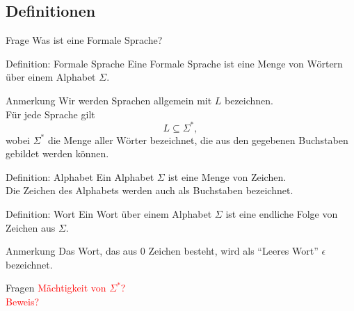 \documentclass[]{beamer}
\begin{document}
\subsection{Definitionen}
\begin{frame}[squeeze]{}{}
  \begin{alertblock}{Frage}
    Was ist eine Formale Sprache?
  \end{alertblock}
  
  \pause
  
  \begin{block}{Definition: Formale Sprache}
    Eine Formale Sprache ist eine Menge von Wörtern über einem Alphabet $\Sigma$. \\
  \end{block}
  
  \pause
  
  \begin{block}{Anmerkung}
    Wir werden Sprachen allgemein mit $L$ bezeichnen. \\
    Für jede Sprache gilt
    \[L \subseteq \Sigma^*,\]
    wobei $\Sigma^*$ die Menge aller Wörter bezeichnet, die aus den gegebenen Buchstaben gebildet werden können. \\
  \end{block}
\end{frame}

\begin{frame}[squeeze]{}{}
  \begin{block}{Definition: Alphabet}
    Ein Alphabet $\Sigma$ ist eine Menge von Zeichen. \\
    Die Zeichen des Alphabets werden auch als Buchstaben bezeichnet.
  \end{block}
  
  \pause
  
  \begin{block}{Definition: Wort}
    Ein Wort über einem Alphabet $\Sigma$ ist eine endliche Folge von Zeichen aus $\Sigma$.
  \end{block}
  
  \pause
  
  \begin{block}{Anmerkung}
    Das Wort, das aus $0$ Zeichen besteht, wird als \enquote{Leeres Wort} $\epsilon$ bezeichnet.
  \end{block}
  
  \pause
  
  \begin{alertblock}{Fragen}
    \textcolor{red}{Mächtigkeit von $\Sigma^*$?} \\
    \pause
    \textcolor{red}{Beweis?}
  \end{alertblock}
\end{frame}
\end{document}
